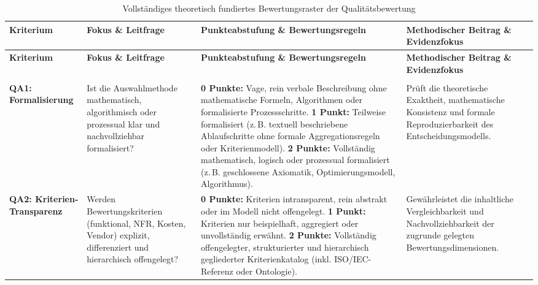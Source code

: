 \begin{landscape}
\begin{xltabular}{\linewidth}{>{\raggedright\arraybackslash}p{3.2cm}>{\raggedright\arraybackslash}p{5.2cm}>{\raggedright\arraybackslash}X>{\raggedright\arraybackslash}p{5.5cm}}
  \caption{Vollständiges theoretisch fundiertes Bewertungsraster der Qualitätsbewertung} \label{tab:anhang_qa_schema} \\
  \toprule
  \textbf{Kriterium} & \textbf{Fokus \& Leitfrage} & \textbf{Punkteabstufung \& Bewertungsregeln} & \textbf{Methodischer Beitrag \& Evidenzfokus} \\
  \midrule
  \endfirsthead
  \toprule
  \textbf{Kriterium} & \textbf{Fokus \& Leitfrage} & \textbf{Punkteabstufung \& Bewertungsregeln} & \textbf{Methodischer Beitrag \& Evidenzfokus} \\
  \midrule
  \endhead
  \midrule
   \\
  \bottomrule
  \endfoot
  \bottomrule
  \endlastfoot
  \textbf{QA1: Formalisierung} 
    & Ist die Auswahlmethode mathematisch, algorithmisch oder prozessual klar und nachvollziehbar formalisiert?
    & \textbf{0 Punkte:} Vage, rein verbale Beschreibung ohne mathematische Formeln, Algorithmen oder formalisierte Prozessschritte. \newline
      \textbf{1 Punkt:} Teilweise formalisiert (z.\,B. textuell beschriebene Ablaufschritte ohne formale Aggregationsregeln oder Kriterienmodell). \newline
      \textbf{2 Punkte:} Vollständig mathematisch, logisch oder prozessual formalisiert (z.\,B. geschlossene Axiomatik, Optimierungsmodell, Algorithmus).
    & Prüft die theoretische Exaktheit, mathematische Konsistenz und formale Reproduzierbarkeit des Entscheidungsmodells. \\
  \addlinespace[6pt]
  \textbf{QA2: Kriterien-Transparenz} 
    & Werden Bewertungskriterien (funktional, NFR, Kosten, Vendor) explizit, differenziert und hierarchisch offengelegt?
    & \textbf{0 Punkte:} Kriterien intransparent, rein abstrakt oder im Modell nicht offengelegt. \newline
      \textbf{1 Punkt:} Kriterien nur beispielhaft, aggregiert oder unvollständig erwähnt. \newline
      \textbf{2 Punkte:} Vollständig offengelegter, strukturierter und hierarchisch gegliederter Kriterienkatalog (inkl. ISO/IEC-Referenz oder Ontologie).
    & Gewährleistet die inhaltliche Vergleichbarkeit und Nachvollziehbarkeit der zugrunde gelegten Bewertungsdimensionen. \\

\end{xltabular}
\end{landscape}
